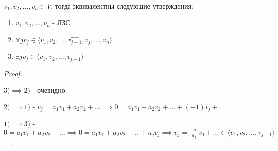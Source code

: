\begin{theorem} ~

    $v_1, v_2, \ldots, v_n \in V$, тогда эквивалентны следующие утверждения:

    \begin{enumerate}
        \item $v_1, v_2, \ldots, v_n$ - ЛЗС
        \item $\forall j v_j \in \langle v_1, v_2, \ldots, \widehat{v_{j-1}}, v_j, \ldots, v_n \rangle$
        \item $\exists j v_j \in \langle v_1, v_2, \ldots, v_{j-1} \rangle$
    \end{enumerate}
    
\end{theorem}
\begin{proof}~

    $3) \implies 2)$ - очевидно

    $2) \implies 1)$ - $v_j = a_1v_1 + a_2v_2+\ldots \implies 0 = a_1v_1 + a_2v_2 + \ldots + (-1)v_j + \ldots$
    
    $1) \implies 3)$ - $0 = a_1v_1 + a_2v_2 + \ldots \implies 0 = a_1v_1 + a_2v_2 + \ldots + a_jv_j \implies v_j = \frac{-a_1}{a_j}v_1 + \ldots \in \langle v_1, v_2, \ldots, v_{j-1} \rangle$
    
\end{proof}